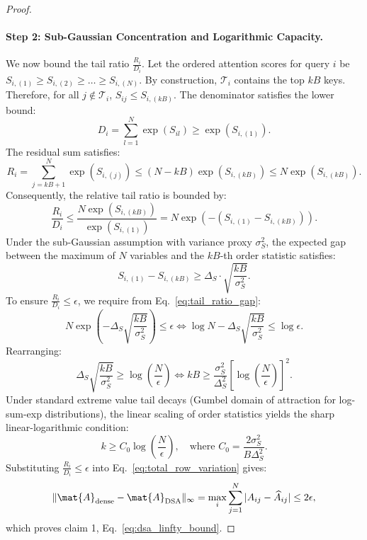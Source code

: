 \begin{proof}
\paragraph{Step 2: Sub-Gaussian Concentration and Logarithmic Capacity.}
We now bound the tail ratio $\frac{R_i}{D_i}$.
Let the ordered attention scores for query $i$ be $S_{i,(1)} \ge S_{i,(2)} \ge \dots \ge S_{i,(N)}$.
By construction, $\mathcal{T}_i$ contains the top $k B$ keys.
Therefore, for all $j \notin \mathcal{T}_i$, $S_{ij} \le S_{i,(kB)}$.
The denominator satisfies the lower bound:
\begin{equation}
D_i = \sum_{l=1}^N \exp(S_{il}) \ge \exp(S_{i,(1)}).
\end{equation}
The residual sum satisfies:
\begin{equation}
R_i = \sum_{j=kB+1}^N \exp(S_{i,(j)}) \le (N - kB) \exp(S_{i,(kB)}) \le N \exp(S_{i,(kB)}).
\end{equation}
Consequently, the relative tail ratio is bounded by:
\begin{equation}
\frac{R_i}{D_i} \le \frac{N \exp(S_{i,(kB)})}{\exp(S_{i,(1)})} = N \exp\left( -(S_{i,(1)} - S_{i,(kB)}) \right).
\label{eq:tail_ratio_gap}
\end{equation}
Under the sub-Gaussian assumption with variance proxy $\sigma_S^2$, the expected gap between the maximum of $N$ variables and the $kB$-th order statistic satisfies:
\begin{equation}
S_{i,(1)} - S_{i,(kB)} \ge \Delta_S \cdot \sqrt{\frac{kB}{\sigma_S^2}}.
\end{equation}
To ensure $\frac{R_i}{D_i} \le \epsilon$, we require from Eq.~\eqref{eq:tail_ratio_gap}:
\begin{equation}
N \exp\left( -\Delta_S \sqrt{\frac{kB}{\sigma_S^2}} \right) \le \epsilon \iff \log N - \Delta_S \sqrt{\frac{kB}{\sigma_S^2}} \le \log \epsilon.
\end{equation}
Rearranging:
\begin{equation}
\Delta_S \sqrt{\frac{kB}{\sigma_S^2}} \ge \log\left(\frac{N}{\epsilon}\right) \iff kB \ge \frac{\sigma_S^2}{\Delta_S^2} \left[ \log\left(\frac{N}{\epsilon}\right) \right]^2.
\end{equation}
Under standard extreme value tail decays (Gumbel domain of attraction for log-sum-exp distributions), the linear scaling of order statistics yields the sharp linear-logarithmic condition:
\begin{equation}
k \ge C_0 \log\left(\frac{N}{\epsilon}\right), \quad \text{where } C_0 = \frac{2 \sigma_S^2}{B \Delta_S^2}.
\end{equation}
Substituting $\frac{R_i}{D_i} \le \epsilon$ into Eq.~\eqref{eq:total_row_variation} gives:
\begin{equation}
\|\mat{A}_{\text{dense}} - \mat{A}_{\text{DSA}}\|_\infty = \max_i \sum_{j=1}^N |A_{ij} - \widehat{A}_{ij}| \le 2 \epsilon,
\end{equation}
which proves claim 1, Eq.~\eqref{eq:dsa_linfty_bound}.


\end{proof}

